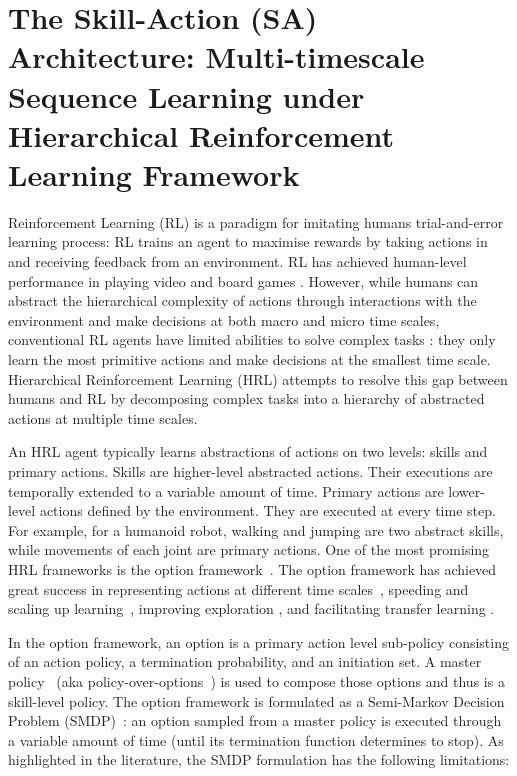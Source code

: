 
\chapter{The Skill-Action (SA) Architecture: Multi-timescale
  Sequence Learning under Hierarchical Reinforcement Learning
  Framework}
\label{cha:sa}


Reinforcement Learning (RL) is a paradigm for imitating humans
trial-and-error learning process: RL trains an agent to maximise
rewards by taking actions in and receiving feedback from an
environment. RL has achieved human-level performance in playing
video and board games \cite{mnih2015human,silver2016mastering}.
However, while humans can abstract the hierarchical complexity of
actions through interactions with the environment and make
decisions at both macro and micro time scales, conventional RL
agents have limited abilities to solve complex tasks
\cite{daniel2016probabilistic}: they only learn the most
primitive actions and make decisions at the smallest time scale.
Hierarchical Reinforcement Learning (HRL) attempts to resolve
this gap between humans and RL by decomposing complex tasks into
a hierarchy of abstracted actions at multiple time scales.

An HRL agent typically learns abstractions of actions on two
levels: skills and primary actions. Skills are higher-level
abstracted actions. Their executions are temporally extended to a
variable amount of time. Primary actions are lower-level actions
defined by the environment. They are executed at every time step.
For example, for a humanoid robot, walking and jumping are two
abstract skills, while movements of each joint are primary
actions. One of the most promising HRL frameworks is the option
framework~\cite{sutton1999between}. The option framework has
achieved great success in representing actions at different time
scales~\cite{bacon2017option}, speeding and scaling up
learning~\cite{bacon2018temporal}, improving exploration
\cite{harb2018waiting}, and facilitating transfer learning
\cite{zhang2019dac}.

In the option framework, an option is a primary action level
sub-policy consisting of an action policy, a termination
probability, and an initiation set. A master
policy~\cite{zhang2019dac} (aka
policy-over-options~\cite{sutton1999between}) is used to compose
those options and thus is a skill-level policy. The option
framework is formulated as a Semi-Markov Decision Problem
(SMDP)~\cite{puterman2014markov}: an option sampled from a master
policy is executed through a variable amount of time (until its
termination function determines to stop). As highlighted in the
literature, the SMDP formulation has the following limitations:

